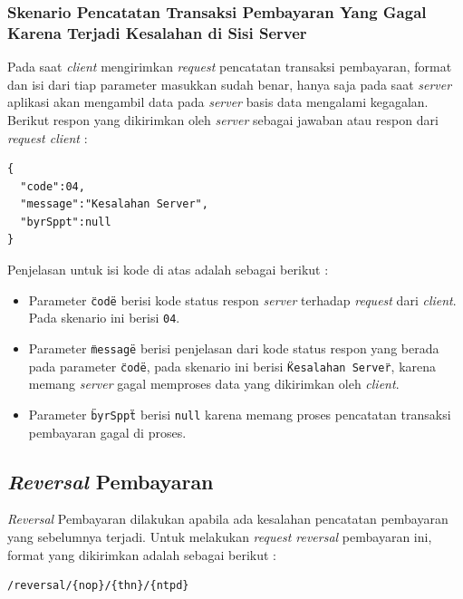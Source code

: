 \documentclass[pdftex,12pt, oneside]{article}
\begin{document}
  \subsubsection{Skenario Pencatatan Transaksi Pembayaran Yang Gagal Karena Terjadi Kesalahan di Sisi Server}  
  
  Pada saat \textit{client} mengirimkan \textit{request} pencatatan transaksi pembayaran, format dan isi dari tiap parameter masukkan sudah benar, hanya saja pada saat \textit{server} aplikasi akan mengambil data pada \textit{server} basis data mengalami kegagalan. Berikut respon yang dikirimkan oleh \textit{server} sebagai jawaban atau respon dari \textit{request client} :
  
  \begin{lstlisting}
{
  "code":04,
  "message":"Kesalahan Server",
  "byrSppt":null
}
  \end{lstlisting}

  Penjelasan untuk isi kode di atas adalah sebagai berikut :
  
  \begin{itemize}
    \item Parameter \texttt{\"code\"} berisi kode status respon \textit{server} terhadap \textit{request} dari \textit{client}. Pada skenario ini berisi \texttt{04}.
    \item Parameter \texttt{\"message\"} berisi penjelasan dari kode status respon yang berada pada parameter \texttt{\"code\"}, pada skenario ini berisi \texttt{\"Kesalahan Server\"}, karena memang \textit{server} gagal memproses data yang dikirimkan oleh \textit{client}.
    \item Parameter \texttt{\"byrSppt\"} berisi \texttt{null} karena memang proses pencatatan transaksi pembayaran gagal di proses.
  \end{itemize}
  
\subsection{\textit{Reversal} Pembayaran}

  \textit{Reversal} Pembayaran dilakukan apabila ada kesalahan pencatatan pembayaran yang sebelumnya terjadi. Untuk melakukan \textit{request reversal} pembayaran ini, format yang dikirimkan adalah sebagai berikut :

  \begin{lstlisting}
/reversal/{nop}/{thn}/{ntpd}
  \end{lstlisting}
  
\end{document}
